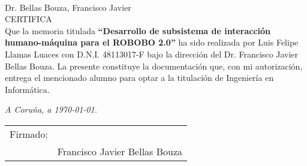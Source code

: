 \thispagestyle{empty}
\mbox{}\\[4cm]
\noindent Dr. Bellas Bouza, Francisco Javier \\[1cm]
\textsc{CERTIFICA}\\[1.5cm]
\indent Que la memoria titulada \textbf{``Desarrollo de subsistema de interacción humano-máquina para el ROBOBO 2.0''}
ha sido realizada por Luis Felipe Llamas Luaces con D.N.I. 48113017-F bajo la
dirección del Dr. Francisco Javier Bellas Bouza. La presente constituye la
documentación que, con mi autorización, entrega el mencionado
alumno para optar a la titulación de Ingeniería en Informática.
\vfill
\begin{flushright}
\emph{A Coruña, a \today{}.} \\[2cm]
\begin{tabular}{ll}
Firmado: & \\
         & Francisco Javier Bellas Bouza \\
\end{tabular}
\end{flushright}
